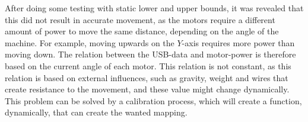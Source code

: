 After doing some testing with static lower and upper bounds, it was revealed that this did not result in accurate movement, as the motors require a different amount of power to move the same distance, depending on the angle of the machine.
For example, moving upwards on the $Y$-axis requires more power than moving down.
The relation between the USB-data and motor-power is therefore based on the current angle of each motor.
This relation is not constant, as this relation is based on external influences, such as gravity, weight and wires that create resistance to the movement, and these value might change dynamically.
This problem can be solved by a calibration process, which will create a function, dynamically, that can create the wanted mapping.
